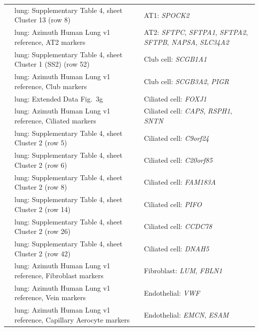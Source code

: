 \begin{longtable}{@{}>{\raggedright\arraybackslash}p{2.0cm} >{\raggedright\arraybackslash}p{4.6cm} >{\raggedright\arraybackslash}p{8.4cm}@{}}
\cite{travagliniMolecularCellAtlas2020} & lung: Supplementary Table 4, sheet Cluster 13 (row 8) & AT1: \textit{SPOCK2} \\
\cite{travagliniMolecularCellAtlas2020} & lung: Azimuth Human Lung v1 reference, AT2 markers & AT2: \textit{SFTPC}, \textit{SFTPA1}, \textit{SFTPA2}, \textit{SFTPB}, \textit{NAPSA}, \textit{SLC34A2} \\
\cite{travagliniMolecularCellAtlas2020} & lung: Supplementary Table 4, sheet Cluster 1 (SS2) (row 52) & Club cell: \textit{SCGB1A1} \\
\cite{travagliniMolecularCellAtlas2020} & lung: Azimuth Human Lung v1 reference, Club markers & Club cell: \textit{SCGB3A2}, \textit{PIGR} \\
\cite{travagliniMolecularCellAtlas2020} & lung: Extended Data Fig.~3g & Ciliated cell: \textit{FOXJ1} \\
\cite{travagliniMolecularCellAtlas2020} & lung: Azimuth Human Lung v1 reference, Ciliated markers & Ciliated cell: \textit{CAPS}, \textit{RSPH1}, \textit{SNTN} \\
\cite{travagliniMolecularCellAtlas2020} & lung: Supplementary Table 4, sheet Cluster 2 (row 5) & Ciliated cell: \textit{C9orf24} \\
\cite{travagliniMolecularCellAtlas2020} & lung: Supplementary Table 4, sheet Cluster 2 (row 6) & Ciliated cell: \textit{C20orf85} \\
\cite{travagliniMolecularCellAtlas2020} & lung: Supplementary Table 4, sheet Cluster 2 (row 8) & Ciliated cell: \textit{FAM183A} \\
\cite{travagliniMolecularCellAtlas2020} & lung: Supplementary Table 4, sheet Cluster 2 (row 14) & Ciliated cell: \textit{PIFO} \\
\cite{travagliniMolecularCellAtlas2020} & lung: Supplementary Table 4, sheet Cluster 2 (row 26) & Ciliated cell: \textit{CCDC78} \\
\cite{travagliniMolecularCellAtlas2020} & lung: Supplementary Table 4, sheet Cluster 2 (row 42) & Ciliated cell: \textit{DNAH5} \\
\cite{travagliniMolecularCellAtlas2020} & lung: Azimuth Human Lung v1 reference, Fibroblast markers & Fibroblast: \textit{LUM}, \textit{FBLN1} \\
\cite{travagliniMolecularCellAtlas2020} & lung: Azimuth Human Lung v1 reference, Vein markers & Endothelial: \textit{VWF} \\
\cite{travagliniMolecularCellAtlas2020} & lung: Azimuth Human Lung v1 reference, Capillary Aerocyte markers & Endothelial: \textit{EMCN}, \textit{ESAM} \\

\end{longtable}
